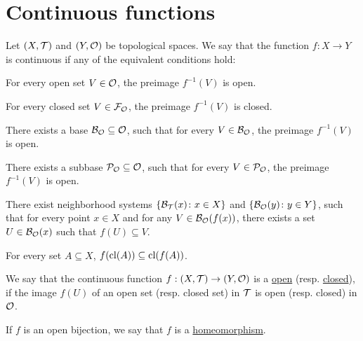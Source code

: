 \section{Continuous functions}\label{sec:continuous_functions}

\begin{definition}\label{def:continuous_function}
  Let $(X, \mathcal T)$ and $(Y, \mathcal O)$ be topological spaces. We say that the function $f: X \to Y$ is continuous if any of the equivalent conditions hold:
  \begin{defenum}
    \item\label{def:continuous_function/direct} For every open set $V \in \mathcal O$, the preimage $f^{-1}(V)$ is open.
    \item\label{def:continuous_function/closed} For every closed set $V \in \mathcal F_{\mathcal O}$, the preimage $f^{-1}(V)$ is closed.
    \item\label{def:continuous_function/base} There exists a base $\mathcal B_{\mathcal O} \subseteq \mathcal O$, such that for every $V \in \mathcal B_{\mathcal O}$, the preimage $f^{-1}(V)$ is open.
    \item\label{def:continuous_function/subbase} There exists a subbase $\mathcal P_{\mathcal O} \subseteq \mathcal O$, such that for every $V \in \mathcal P_{\mathcal O}$, the preimage $f^{-1}(V)$ is open.
    \item\label{def:continuous_function/local_base} There exist neighborhood systems $\{ \mathcal B_{\mathcal T}(x) \colon x \in X \}$ and $\{ \mathcal B_{\mathcal O}(y) \colon y \in Y \}$, such that for every point $x \in X$ and for any $V \in \mathcal B_{\mathcal O}(f(x))$, there exists a set $U \in \mathcal B_{\mathcal O}(x)$ such that $f(U) \subseteq V$.
    \item\label{def:continuous_function/closure} For every set $A \subseteq X$, $f(\operatorname{cl}(A)) \subseteq \operatorname{cl}(f(A))$.
  \end{defenum}
\end{definition}

\begin{definition}\label{def:homeomorphism}
  We say that the continuous function $f: (X, \mathcal T) \to (Y, \mathcal O)$ is a \ul{open} (resp. \ul{closed}), if the image $f(U)$ of an open set (resp. closed set) in $\mathcal T$ is open (resp. closed) in $\mathcal O$.

  If $f$ is an open bijection, we say that $f$ is a \ul{homeomorphism}.
\end{definition}
